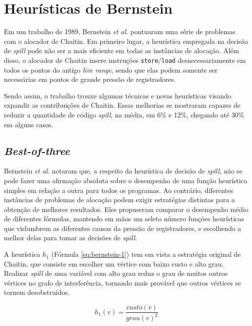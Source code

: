 \documentclass[
	12pt,				%
	openright,			%
	twoside,			%
	a4paper,			%
	tcc,			%
	]{ABNT-DC-UEL}
\begin{document}
\section{Heurísticas de Bernstein}

Em um trabalho de 1989, Bernstein \textit{et al.} \cite{bernstein:89} pontuaram uma série de problemas com o alocador de Chaitin. Em primeiro lugar, a heurística empregada na decisão de \textit{spill} pode não ser a mais eficiente em todas as instâncias de alocação. Além disso, o alocador de Chaitin insere instruções \texttt{store}/\texttt{load} desnecessariamente em todos os pontos do antigo \textit{live range}, sendo que elas podem somente ser necessárias em pontos de grande pressão de registradores. 

Sendo assim, o trabalho trouxe algumas técnicas e novas heurísticas visando expandir as contribuições de Chaitin. Essas melhorias se mostraram capazes de reduzir a quantidade de código \textit{spill}, na média, em 6\% e 12\%, chegando até 30\% em alguns casos.

\subsection{\textit{Best-of-three}}

Bernstein \textit{et al.} notaram que, a respeito da heurística de decisão de \textit{spill}, não se pode fazer uma afirmação absoluta sobre o desempenho de uma função heurística simples em relação a outra para todos os programas. Ao contrário, diferentes instâncias de problemas de alocação podem exigir estratégias distintas para a obtenção de melhores resultados. Eles propuseram comparar o desempenho médio de diferentes fórmulas, mantendo em mãos um seleto número funções heurísticas que vislumbrem as diferentes causas da pressão de registradores, e escolhendo a melhor delas para tomar as decisões de \textit{spill}.

A heurística $h_1$ (Fórmula \ref{eq:bernstein-1}) tem em vista a estratégia original de Chaitin, que consiste em escolher um vértice com baixo custo e alto grau. Realizar \textit{spill} de uma variável com alto grau reduz o grau de muitos outros vértices no grafo de interferência, tornando mais provável que outros vértices se tornem desobstruídos.

\begin{equation}
    h_1(v) = \frac{\textit{custo}(v)}{\textit{grau}(v)^2}
    \label{eq:bernstein-1}
\end{equation}
\end{document}
